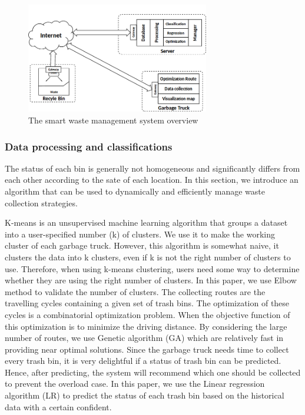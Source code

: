 \documentclass[conference,compsoc]{IEEEtran}
\begin{document}
\begin{figure}
	\centering
	\includegraphics[width=8cm]{Model1-2}
	\caption{The smart waste management system overview}
	\label{fig2}
\end{figure}




\subsubsection{Data processing and classifications}
The status of each bin is generally not homogeneous and significantly differs from each other according to the sate of each location. In this section, we introduce an algorithm that can be used to dynamically and efficiently manage waste collection strategies.
\par K-means \cite{Kanungo2003} is an unsupervised machine learning algorithm that groups a dataset into a user-specified number (k) of clusters. We use it to make the working cluster of each garbage truck. However, this algorithm is somewhat naive, it clusters the data into k clusters, even if k is not the right number of clusters to use. Therefore, when using k-means clustering, users need some way to determine whether they are using the right number of clusters. In this paper, we use Elbow method \cite{Kodinariya2013} to validate the number of clusters. The collecting routes are the travelling cycles containing a given set of trash bins. The optimization of these cycles is a combinatorial optimization problem. When the objective function of this optimization is to minimize the driving distance. By considering the large number of routes, we use Genetic algorithm (GA) \cite{Gutierrez2008} which are relatively fast in providing near optimal solutions. Since the garbage truck needs time to collect every trash bin, it is very delightful if a status of trash bin can be predicted. Hence, after predicting, the system will recommend which one should be collected to prevent the overload case. In this paper, we use the Linear regression algorithm (LR) \cite{Ferraro2010} to predict the status of each trash bin based on the historical data with a certain confident.
\end{document}
